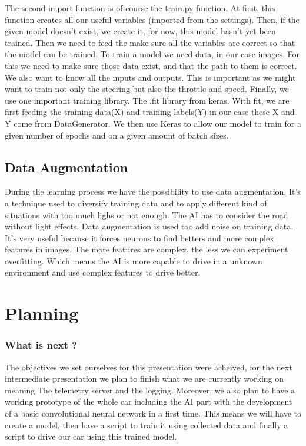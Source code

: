 \documentclass[12pt]{article}
\begin{document}
The second import function is of course the train.py function. At first, this function creates all our useful variables (imported from the settings). Then, if the given model doesn’t exist, we create it, for now, this model hasn’t yet been trained.  Then we need to feed the make sure all the variables are correct so that the model can be trained.  To train a model we need data, in our case images. For this we need to make sure those data exist, and that the path to them is correct.  
We also want to know all the inputs and outputs. This is important as we might want to train not only the steering but also the throttle and speed.  
Finally, we use one important training library. The .fit library from keras. With fit, we are first feeding the training data(X) and training labels(Y) in our case these X and Y come from DataGenerator. We then use Keras to allow our model to train for a given number of epochs and on a given amount of batch sizes. 

\subsection{Data Augmentation}
During the learning process we have the possibility to use data augmentation. It’s a technique used to diversify training data and to apply different kind of situations with too much lighs or not enough. The AI has to consider the road without light effects. Data augmentation is used too add noise on training data. It’s very useful because it forces neurons to find betters and more complex features in images. The more features are complex, the less we can experiment overfitting. Which means the AI is more capable to drive in a unknown environment and use complex features to drive better.

\newpage

\section {Planning}
\subsubsection {What is next ?}
The objectives we set ourselves for this presentation were acheived, for the next intermediate presentation we plan to finish what we are currently working on meaning The telemetry server and the logging. Moreover, we also plan to have a working prototype of the whole car including the AI part with the development of a basic convolutional neural network in a first time. This means we will have to create a model, then have a script to train it using collected data and finally a script to drive our car using this trained model.
\end{document}
